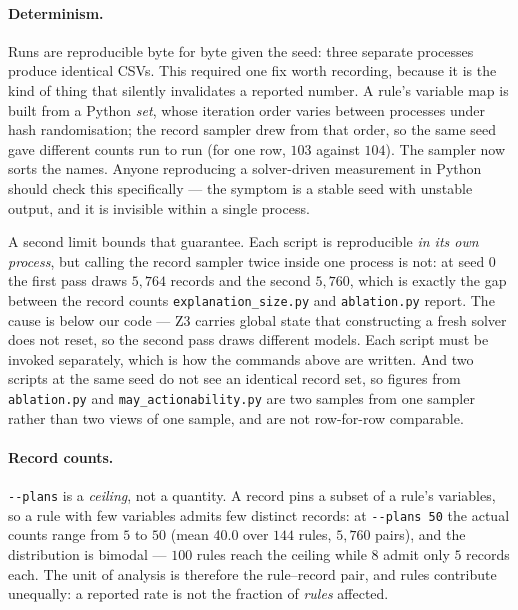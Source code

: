 \documentclass{article}
\begin{document}
\paragraph{Determinism.}
Runs are reproducible byte for byte given the seed: three separate processes
produce identical CSVs. This required one fix worth recording, because it is
the kind of thing that silently invalidates a reported number. A rule's
variable map is built from a Python \emph{set}, whose iteration order varies
between processes under hash randomisation; the record sampler drew from that
order, so the same seed gave different counts run to run (for one row, $103$
against $104$). The sampler now sorts the names. Anyone reproducing a
solver-driven measurement in Python should check this specifically --- the
symptom is a stable seed with unstable output, and it is invisible within a
single process.

A second limit bounds that guarantee. Each script is reproducible \emph{in its
own process}, but calling the record sampler twice inside one process is not:
at seed $0$ the first pass draws $5{,}764$ records and the second $5{,}760$,
which is exactly the gap between the record counts \texttt{explanation\_size.py}
and \texttt{ablation.py} report. The cause is below our code --- Z3 carries global state
that constructing a fresh solver does not reset, so the second pass draws
different models. Each script must be
invoked separately, which is how the commands above are written. And two scripts
at the same seed do not see an identical record set, so figures from
\texttt{ablation.py} and \texttt{may\_actionability.py} are two samples from one
sampler rather than two views of one sample, and are not row-for-row comparable.

\paragraph{Record counts.}
\texttt{-{}-plans} is a \emph{ceiling}, not a quantity. A record pins a subset
of a rule's variables, so a rule with few variables admits few distinct
records: at \texttt{-{}-plans 50} the actual counts range from $5$ to $50$
(mean $40.0$ over $144$ rules, $5{,}760$ pairs), and the distribution is
bimodal --- $100$ rules reach the ceiling while $8$ admit only $5$ records
each. The unit of analysis is therefore the rule--record pair, and rules
contribute unequally: a reported rate is not the fraction of \emph{rules}
affected.
\end{document}
